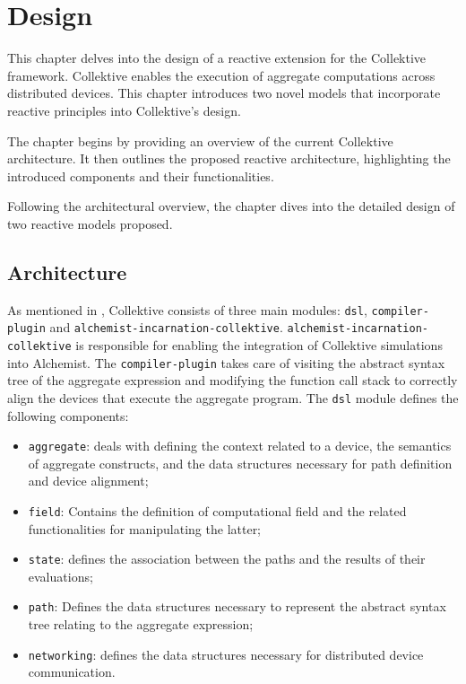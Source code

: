 
\chapter{Design}
\label{chap:design}

This chapter delves into the design of a reactive extension for the Collektive framework. Collektive enables the execution of aggregate computations across distributed devices. This chapter introduces two novel models that incorporate reactive principles into Collektive's design.

The chapter begins by providing an overview of the current Collektive architecture. It then outlines the proposed reactive architecture, highlighting the introduced components and their functionalities.

Following the architectural overview, the chapter dives into the detailed design of two reactive models proposed.

\section{Architecture}

As mentioned in , Collektive consists of three main modules: \texttt{dsl}, \texttt{compiler-plugin} and \texttt{alchemist-incarnation-collektive}. \texttt{alchemist-incarnation-collektive} is responsible for enabling the integration of Collektive simulations into Alchemist. The \texttt{compiler-plugin} takes care of visiting the abstract syntax tree of the aggregate expression and modifying the function call stack to correctly align the devices that execute the aggregate program. The \texttt{dsl} module defines the following components:
\begin{itemize}
    \item \texttt{aggregate}: deals with defining the context related to a device, the semantics of aggregate constructs, and the data structures necessary for path definition and device alignment;
    \item \texttt{field}: Contains the definition of computational field and the related functionalities for manipulating the latter;
    \item \texttt{state}: defines the association between the paths and the results of their evaluations;
    \item \texttt{path}: Defines the data structures necessary to represent the abstract syntax tree relating to the aggregate expression;
    \item \texttt{networking}: defines the data structures necessary for distributed device communication.
\end{itemize}


